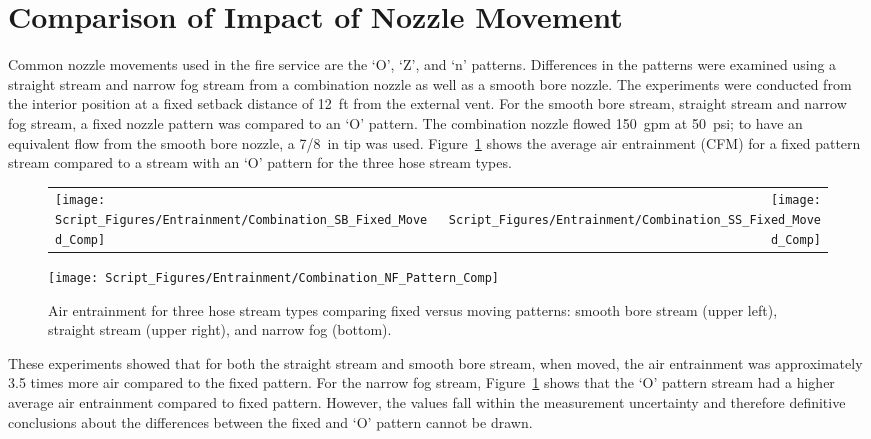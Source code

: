 \documentclass[12pt,oneside]{book}
\begin{document}
\clearpage

\section{Comparison of Impact of Nozzle Movement}
\label{sec:movement}

Common nozzle movements used in the fire service are the `O', `Z', and `n' patterns. Differences in the patterns were examined using a straight stream and narrow fog stream from a combination nozzle as well as a smooth bore nozzle. The experiments were conducted from the interior position at a fixed setback distance of 12~ft from the external vent. For the smooth bore stream, straight stream and narrow fog stream, a fixed nozzle pattern was compared to an `O' pattern. The combination nozzle flowed 150~gpm at 50~psi; to have an equivalent flow from the smooth bore nozzle, a 7/8~in tip was used. Figure~\ref{fig:SB_SS_NF_Movement_Comparison} shows the average air entrainment (CFM) for a fixed pattern stream compared to a stream with an `O' pattern for the three hose stream types.

\begin{figure}[!ht]
\begin{tabular*}{\textwidth}{lr}
\texttt{[image: Script\_Figures/Entrainment/Combination\_SB\_Fixed\_Moved\_Comp]} &
\texttt{[image: Script\_Figures/Entrainment/Combination\_SS\_Fixed\_Moved\_Comp]} \\
\end{tabular*}
\centering
\texttt{[image: Script\_Figures/Entrainment/Combination\_NF\_Pattern\_Comp]} \\
\caption[Air Entrainment Comparison of Fixed Versus Moving Patterns]{Air entrainment for three hose stream types comparing fixed versus moving patterns: smooth bore stream (upper left), straight stream (upper right), and narrow fog (bottom).}
\label{fig:SB_SS_NF_Movement_Comparison}
\end{figure}

These experiments showed that for both the straight stream and smooth bore stream, when moved, the air entrainment was approximately 3.5 times more air compared to the fixed pattern. For the narrow fog stream, Figure~\ref{fig:SB_SS_NF_Movement_Comparison} shows that the `O' pattern stream had a higher average air entrainment compared to fixed pattern. However, the values fall within the measurement uncertainty and therefore definitive conclusions about the differences between the fixed and `O' pattern cannot be drawn. 
\end{document}
